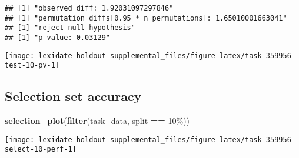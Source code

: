 \documentclass[
]{book}
\newenvironment{Shaded}{\begin{snugshade}}{\end{snugshade}}
\newcommand{\AttributeTok}[1]{\textcolor[rgb]{0.13,0.29,0.53}{#1}}
\newcommand{\DecValTok}[1]{\textcolor[rgb]{0.00,0.00,0.81}{#1}}
\newcommand{\FunctionTok}[1]{\textcolor[rgb]{0.13,0.29,0.53}{\textbf{#1}}}
\newcommand{\NormalTok}[1]{#1}
\newcommand{\OtherTok}[1]{\textcolor[rgb]{0.56,0.35,0.01}{#1}}
\newcommand{\SpecialCharTok}[1]{\textcolor[rgb]{0.81,0.36,0.00}{\textbf{#1}}}
\newcommand{\StringTok}[1]{\textcolor[rgb]{0.31,0.60,0.02}{#1}}
\begin{document}
\begin{Shaded}
\end{Shaded}

\begin{verbatim}
## [1] "observed_diff: 1.92031097297846"
## [1] "permutation_diffs[0.95 * n_permutations]: 1.65010001663041"
## [1] "reject null hypothesis"
## [1] "p-value: 0.03129"
\end{verbatim}

\texttt{[image: lexidate-holdout-supplemental\_files/figure-latex/task-359956-test-10-pv-1]}

\hypertarget{selection-set-accuracy-26}{%
\subsection{Selection set accuracy}\label{selection-set-accuracy-26}}

\begin{Shaded}
\begin{Highlighting}[]
\FunctionTok{selection\_plot}\NormalTok{(}\FunctionTok{filter}\NormalTok{(task\_data, split }\SpecialCharTok{==} \StringTok{\textquotesingle{}10\%\textquotesingle{}}\NormalTok{))}
\end{Highlighting}
\end{Shaded}

\texttt{[image: lexidate-holdout-supplemental\_files/figure-latex/task-359956-select-10-perf-1]}
\end{document}
